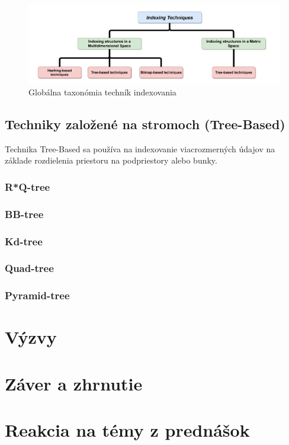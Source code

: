 \documentclass[10pt,twoside,slovak,a4paper]{article}
\begin{document}
\paragraph{}
\begin{figure}[tbh]
    \centering
    \includegraphics[width=1\textwidth]{techniky.pdf}
\caption{Globálna taxonómia techník indexovania \cite{2021}}
\label{f:techniky}
\end{figure}

\subsection{Techniky založené na stromoch (Tree-Based)}
 Technika Tree-Based sa používa na indexovanie viacrozmerných údajov na základe rozdielenia priestoru na podpriestory alebo bunky.\cite{2021}


\subsubsection{R*Q-tree}
\subsubsection{BB-tree}
\subsubsection{Kd-tree}
\subsubsection{Quad-tree}
\subsubsection{Pyramid-tree}

\section{Výzvy} \label{vyzvy}




\section{Záver a zhrnutie} \label{zaver}

\section{Reakcia na témy z prednášok} \label{temy}

\newpage


\end{document}
